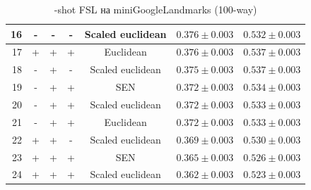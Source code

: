 \documentclass[a4paper, 12pt]{report}
\begin{document}
\begin{table}[h!]
\begin{adjustbox}{center}
\begin{tabular}{| r | c c c c | c |  c | }
    \hline
 16 & -               & -      & -      & Scaled euclidean & $0.376 \pm 0.003$ & $0.532 \pm 0.003$ \\
    \hline
 17 & +               & +      & +      & Euclidean        & $0.376 \pm 0.003$ & $0.537 \pm 0.003$ \\
    \hline
 18 & -               & +      & -      & Scaled euclidean & $0.375 \pm 0.003$ & $0.537 \pm 0.003$ \\
    \hline
 19 & -               & +      & +      & SEN              & $0.372 \pm 0.003$ & $0.534 \pm 0.003$ \\
    \hline
 20 & -               & +      & +      & Scaled euclidean & $0.372 \pm 0.003$ & $0.533 \pm 0.003$ \\
    \hline
 21 & -               & +      & +      & Euclidean        & $0.372 \pm 0.003$ & $0.533 \pm 0.003$ \\
    \hline
 22 & +               & +      & -      & Scaled euclidean & $0.369 \pm 0.003$ & $0.530 \pm 0.003$ \\
    \hline
 23 & +               & +      & +      & SEN              & $0.365 \pm 0.003$ & $0.526 \pm 0.003$ \\
    \hline
 24 & +               & +      & +      & Scaled euclidean & $0.362 \pm 0.003$ & $0.523 \pm 0.003$ \\
\hline
\end{tabular}
\end{adjustbox}
\caption{-shot FSL на miniGoogleLandmarks (100-way)}
\end{table}
 
 
\end{document}
